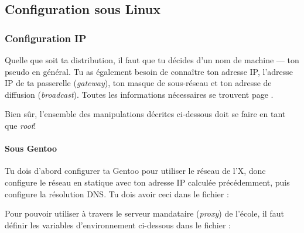 




\subsection{Configuration sous Linux}

\subsubsection{Configuration IP}
Quelle que soit ta distribution, il faut que tu décides d'un nom de
machine --- ton pseudo en général. Tu as également besoin de
conna\^itre ton adresse IP, l'adresse IP de ta passerelle (\emph{gateway}), ton masque de sous-réseau et ton adresse de diffusion (\emph{broadcast}).
Toutes les informations nécessaires se trouvent page
\pageref{calcul_ip}.

Bien sûr, l'ensemble des manipulations décrites ci-dessous doit se faire en tant que \emph{root}!


\paragraph{Sous Gentoo}
Tu dois d'abord configurer ta Gentoo pour utiliser le réseau de l'X, donc configure le réseau en statique avec ton adresse IP calculée précédemment, puis
configure la résolution DNS. Tu dois avoir ceci dans le fichier  :
\noindent {}

\label{gentoo_mirror} Pour pouvoir utiliser  à travers le serveur mandataire (\emph{proxy}) de l'école, il faut définir les variables d'environnement
ci-dessous dans le fichier  :

